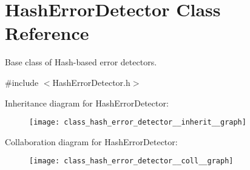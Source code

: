 \hypertarget{class_hash_error_detector}{}\section{Hash\+Error\+Detector Class Reference}
\label{class_hash_error_detector}


Base class of Hash-\/based error detectors.  




{\ttfamily \#include $<$Hash\+Error\+Detector.\+h$>$}



Inheritance diagram for Hash\+Error\+Detector\+:\nopagebreak
\begin{figure}[H]
\begin{center}
\leavevmode
\texttt{[image: class\_hash\_error\_detector\_\_inherit\_\_graph]}
\end{center}
\end{figure}


Collaboration diagram for Hash\+Error\+Detector\+:\nopagebreak
\begin{figure}[H]
\begin{center}
\leavevmode
\texttt{[image: class\_hash\_error\_detector\_\_coll\_\_graph]}
\end{center}
\end{figure}
